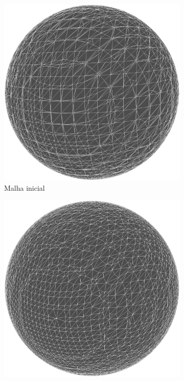 \documentclass[11pt]{article}
\begin{document}
		\begin{figure}
			\centering
			\begin{subfigure}[b]{0.45\textwidth}
				\centering
				\includegraphics[width=\textwidth]{figures/0iter_sphere_mesh}
				\caption{Malha inicial}				
			\end{subfigure}
			\begin{subfigure}[b]{0.45\textwidth}
				\centering
				\includegraphics[width=\textwidth]{figures/10iter_sphere_mesh}

\end{subfigure}
\end{figure}
\end{document}
